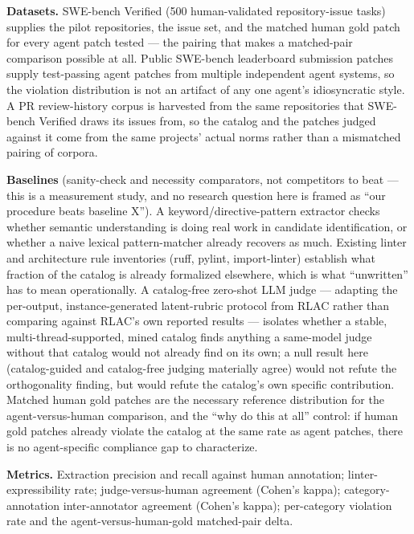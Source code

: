 \documentclass[11pt]{article}
\begin{document}
\textbf{Datasets.} SWE-bench Verified (500 human-validated repository-issue tasks) supplies the pilot repositories, the issue set, and the matched human gold patch for every agent patch tested --- the pairing that makes a matched-pair comparison possible at all. Public SWE-bench leaderboard submission patches supply test-passing agent patches from multiple independent agent systems, so the violation distribution is not an artifact of any one agent's idiosyncratic style. A PR review-history corpus is harvested from the same repositories that SWE-bench Verified draws its issues from, so the catalog and the patches judged against it come from the same projects' actual norms rather than a mismatched pairing of corpora.

\textbf{Baselines} (sanity-check and necessity comparators, not competitors to beat --- this is a measurement study, and no research question here is framed as ``our procedure beats baseline X''). A keyword/directive-pattern extractor checks whether semantic understanding is doing real work in candidate identification, or whether a naive lexical pattern-matcher already recovers as much. Existing linter and architecture rule inventories (ruff, pylint, import-linter) establish what fraction of the catalog is already formalized elsewhere, which is what ``unwritten'' has to mean operationally. A catalog-free zero-shot LLM judge --- adapting the per-output, instance-generated latent-rubric protocol from RLAC rather than comparing against RLAC's own reported results --- isolates whether a stable, multi-thread-supported, mined catalog finds anything a same-model judge without that catalog would not already find on its own; a null result here (catalog-guided and catalog-free judging materially agree) would not refute the orthogonality finding, but would refute the catalog's own specific contribution. Matched human gold patches are the necessary reference distribution for the agent-versus-human comparison, and the ``why do this at all'' control: if human gold patches already violate the catalog at the same rate as agent patches, there is no agent-specific compliance gap to characterize.

\textbf{Metrics.} Extraction precision and recall against human annotation; linter-expressibility rate; judge-versus-human agreement (Cohen's kappa); category-annotation inter-annotator agreement (Cohen's kappa); per-category violation rate and the agent-versus-human-gold matched-pair delta.
\end{document}
